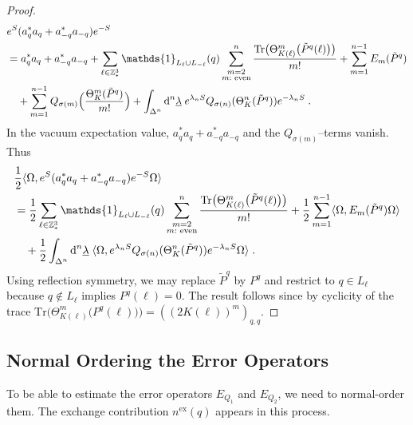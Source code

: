 \documentclass[12pt,a4paper]{article}
\numberwithin{equation}{section}
\newcommand{\1}{\mathbb{I}}
\newcommand{\di}{\textnormal{d}}
\newcommand{\ex}{\mathrm{ex}}
\newcommand{\Z}{\mathbb{Z}}
\newcommand{\half}{\frac{1}{2}}
\theoremstyle{plain}
\theoremstyle{definition}
\theoremstyle{remark}
\theoremstyle{plain}
\theoremstyle{definition}
\theoremstyle{remark}
\begin{document}
\begin{proof}
\begin{align}
	&e^{S} (a_q^* a_q + a_{-q}^* a_{-q}) e^{-S} \nonumber\\
	&= a_q^* a_q + a_{-q}^* a_{-q}
		+ \sum_{\ell\in \Z^3_*} \mathds{1}_{L_\ell \cup L_{-\ell}}(q) \sum_{\substack{m=2\\m:\textnormal{ even}}}^n \frac{\mathrm{Tr} \big(\Theta^m_{K(\ell)} \big( \tilde{P}^q(\ell) \big) \big)}{m!}
		+ \sum_{m=1}^{n-1} E_m(\tilde{P}^q) \nonumber\\
	&\quad+ \sum_{m=1}^{n-1}
		Q_{\sigma(m)} \Big( \frac{\Theta^m_{K}(\tilde{P}^q)}{m!} \Big)
		+\int_{\Delta^n} \di^n \underline{\lambda} \;
		e^{\lambda_n S}Q_{\sigma(n)}(\Theta^n_K (\tilde{P}^q)) e^{-\lambda_n S} \;.
\end{align}
In the vacuum expectation value, $ a_q^* a_q + a_{-q}^* a_{-q} $ and the $ Q_{\sigma(m)} $--terms vanish. Thus
\begin{align}
	& \half \langle \Omega, e^{S} (a_q^* a_q + a_{-q}^* a_{-q}) e^{-S} \Omega \rangle \nonumber\\
	&= \half \sum_{\ell\in \Z^3_*} \mathds{1}_{L_\ell \cup L_{-\ell}}(q) \sum_{\substack{m=2\\m:\textnormal{ even}}}^n \frac{\mathrm{Tr} \big(\Theta^m_{K(\ell)} \big( \tilde{P}^q(\ell) \big) \big)}{m!}
	+ \half \sum_{m=1}^{n-1} \langle \Omega, E_m(\tilde{P}^q) \Omega \rangle \nonumber\\
	&\quad + \half \int_{\Delta^n} \di^n \underline{\lambda} \;
		\langle \Omega, e^{\lambda_n S}Q_{\sigma(n)}(\Theta^n_{K}(\tilde{P}^q)) e^{-\lambda_n S} \Omega \rangle \;.
\end{align}
Using reflection symmetry, we may replace $ \tilde{P}^q $ by $ P^q $ and restrict to $ q \in L_\ell $ because $ q \notin L_\ell$ implies $P^q(\ell) = 0 $. The result follows since by cyclicity of the trace $ \mathrm{Tr} \big(\Theta^m_{K(\ell)} \big( P^q(\ell) \big) \big) = ((2K(\ell))^m)_{q,q} $.
\end{proof}






\subsection{Normal Ordering the Error Operators}
\label{sec:extraction_ex}

To be able to estimate the error operators $ E_{Q_1} $ and $ E_{Q_2} $, we need to normal-order them. The exchange contribution $ n^{\ex}(q) $ appears in this process.
\end{document}
